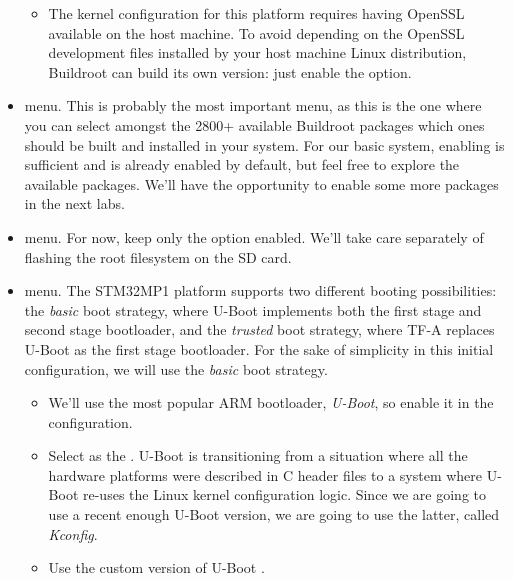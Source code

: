\begin{itemize}
\begin{itemize}
  \item The kernel configuration for this platform requires having
    OpenSSL available on the host machine. To avoid depending on the
    OpenSSL development files installed by your host machine Linux
    distribution, Buildroot can build its own version: just enable the
     option.

  \end{itemize}

\item {} menu. This is probably the most important
  menu, as this is the one where you can select amongst the 2800+
  available Buildroot packages which ones should be built and
  installed in your system. For our basic system, enabling
   is sufficient and is already enabled by default, but
  feel free to explore the available packages. We'll have the
  opportunity to enable some more packages in the next labs.

\item {} menu. For now, keep only the  option enabled. We'll take care separately of
  flashing the root filesystem on the SD card.

\item {} menu. The STM32MP1 platform supports two
  different booting possibilities: the {\em basic} boot strategy,
  where U-Boot implements both the first stage and second stage
  bootloader, and the {\em trusted} boot strategy, where TF-A replaces
  U-Boot as the first stage bootloader. For the sake of simplicity in
  this initial configuration, we will use the {\em basic} boot
  strategy.

  \begin{itemize}

  \item We'll use the most popular ARM bootloader, {\em U-Boot}, so
    enable it in the configuration.

  \item Select  as the . U-Boot is
    transitioning from a situation where all the hardware platforms
    were described in C header files to a system where U-Boot re-uses
    the Linux kernel configuration logic. Since we are going to use a
    recent enough U-Boot version, we are going to use the latter,
    called {\em Kconfig}.

  \item Use the custom version of U-Boot .


\end{itemize}
\end{itemize}
